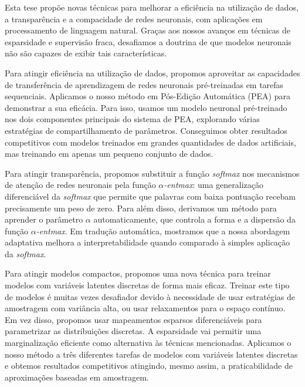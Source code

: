 \onehalfspacing
\begin{resumo}

    Esta tese propõe novas técnicas para melhorar a eficiência na
    utilização de dados, a transparência e a compacidade de redes
    neuronais, com aplicações em processamento de linguagem
    natural. Graças aos nossos avanços em técnicas de
    esparsidade e supervisão fraca, desafiamos a doutrina de que
    modelos neuronais não são capazes de exibir tais
    características.

    Para atingir eficiência na utilização de dados, propomos
    aproveitar as capacidades de transferência de aprendizagem de
    redes neuronais pré-treinadas em tarefas sequenciais. Aplicamos o
    nosso método em Pós-Edição Automática (PEA) para demonstrar a sua
    eficácia. Para isso, usamos um modelo neuronal pré-treinado nos
    dois componentes principais do sistema de PEA, explorando várias
    estratégias de compartilhamento de parâmetros. Conseguimos obter
    resultados competitivos com modelos treinados em grandes
    quantidades de dados artificiais, mas treinando em apenas um
    pequeno conjunto de dados.

    Para atingir transparência, propomos substituir a função
    \textit{softmax} nos mecanismos de atenção de redes neuronais
    pela função \textit{$\alpha$-entmax}: uma generalização
    diferenciável da \textit{softmax} que permite que palavras com
    baixa pontuação recebam precisamente um peso de zero. Para além
    disso, derivamos um método para aprender o parâmetro $\alpha$
    automaticamente, que controla a forma e a dispersão da função
    \textit{$\alpha$-entmax}. Em tradução automática, mostramos que a nossa
    abordagem adaptativa melhora a interpretabilidade quando comparado
    à simples aplicação da \textit{softmax}.

    Para atingir modelos compactos, propomos uma nova técnica para
    treinar modelos com variáveis latentes discretas de forma mais
    eficaz. Treinar este tipo de modelos é muitas vezes desafiador devido
    à necessidade de usar estratégias de amostragem com variância alta,
    ou usar relaxamentos para o espaço contínuo. Em vez disso, propomos usar
    mapeamentos esparsos diferenciáveis para parametrizar as
    distribuições discretas. A esparsidade vai permitir uma marginalização eficiente como
    alternativa às técnicas mencionadas.
    Aplicamos o nosso método a três diferentes tarefas de modelos
    com variáveis latentes discretas e obtemos resultados competitivos
    atingindo, mesmo assim, a praticabilidade de aproximações
    baseadas em amostragem.

\end{resumo}
